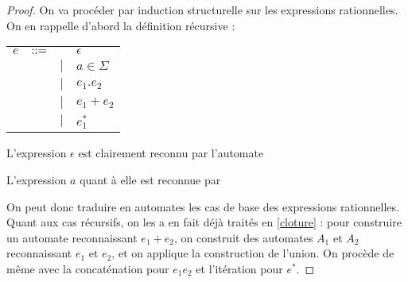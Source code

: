 \begin{proof}
On va procéder par induction structurelle sur les expressions rationnelles. On en rappelle d'abord la définition récursive : 

\begin{tabular}{cccl}
$e$ & $\textcolor{black}{::=}$ & & $\epsilon$\\
& & $|$&  $a \in \Sigma$\\
& & $|$&  $e_1.e_2$\\
& & $|$&  $e_1+e_2$\\
& & $|$&  $e_1^*$\\
\end{tabular}

L'expression $\epsilon$ est clairement reconnu par l'automate 


\begin{figure}[H]
\centering
{}
\end{figure}

L'expression $a$ quant à elle est reconnue par 


\begin{figure}[H]
\centering
{}
\end{figure}

On peut donc traduire en automates les cas de base des expressions rationnelles. Quant aux cas récursifs, on les a en fait déjà traités en \ref{cloture} : pour construire un automate reconnaissant $e_1 + e_2$, on construit des automates $A_1$ et $A_2$ reconnaissant $e_1$ et $e_2$, et on applique la construction de l'union. On procède de même avec la concaténation pour $e_1e_2$ et l'itération pour $e^*$.
\end{proof}

